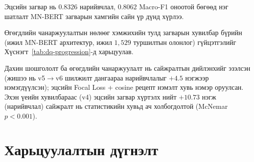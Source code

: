 Эцсийн загвар нь $\mathbf{0.8326}$ нарийвчлал, $\mathbf{0.8062}$ Macro-F1
оноотой бөгөөд нэг шатлалт MN-BERT загварын хамгийн сайн үр дүнд хүрлээ.

Өгөгдлийн чанаржуулалтын нөлөөг хэмжихийн тулд загварын хувилбар бүрийн
(ижил MN-BERT архитектур, ижил $1{,}529$ туршилтын олонлог) гүйцэтгэлийг
Хүснэгт~\ref{tab:dq-progression}-д харьцуулав.

\begin{table}[H]
\centering
\caption{Өгөгдлийн чанаржуулалтын явц --- хувилбар тус бүрийн туршилтын
  гүйцэтгэл (нэг шатлалт MN-BERT, $n=1{,}529$)}
\label{tab:dq-progression}
\end{table}

Дахин шошгололт ба өгөгдлийн чанаржуулалт нь сайжралтын дийлэнхийг эзэлсэн
(жишээ нь v5$\to$v6 шилжилт дангаараа нарийвчлалыг $+4.5$ нэгжээр нэмэгдүүлсэн);
эцсийн Focal Loss + cosine рецепт нэмэлт хувь нэмэр оруулсан. Эхэн үеийн
хувилбараас (v4) эцсийн загвар хүртэлх нийт $+10.73$ нэгж (нарийвчлал) сайжралт
нь статистикийн хувьд ач холбогдолтой (McNemar $p<0.001$).

\section{Харьцуулалтын дүгнэлт}
\label{sec:comparison}

